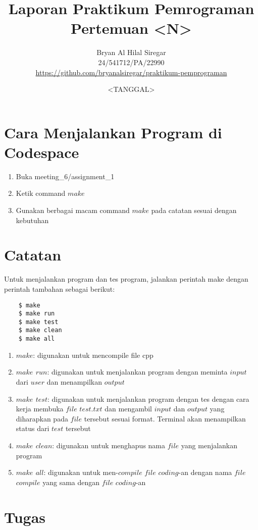 \documentclass{article}
\title{Laporan Praktikum Pemrograman\\Pertemuan <N>}
\author{Bryan Al Hilal Siregar\\ 24/541712/PA/22990\\ \href{https://github.com/bryanalsiregar/praktikum-pemprograman}{https://github.com/bryanalsiregar/praktikum-pemprograman}}
\date{<TANGGAL>}
\begin{document}
\maketitle

\section{Cara Menjalankan Program di Codespace}
\begin{enumerate}
    \item Buka meeting\_6/assignment\_1
    \item Ketik command $make$
    \item Gunakan berbagai macam command $make$ pada catatan sesuai dengan kebutuhan
\end{enumerate}

\section{Catatan}

Untuk menjalankan program dan tes program, jalankan perintah make dengan perintah tambahan sebagai berikut:
\begin{verbatim}
    $ make
    $ make run
    $ make test
    $ make clean 
    $ make all
\end{verbatim}

\begin{enumerate}
    \item \textbf{$make$}: digunakan untuk mencompile file cpp
    \item \textbf{$make$ $run$}: digunakan untuk menjalankan program dengan meminta $input$ dari $user$ dan menampilkan $output$
    \item \textbf{$make$ $test$}: digunakan untuk menjalankan program dengan tes dengan cara kerja membuka $file$ $test.txt$ dan mengambil $input$ dan $output$ yang diharapkan pada $file$ tersebut sesuai format. Terminal akan menampilkan status dari $test$ tersebut
    \item \textbf{$make$ $clean$}: digunakan untuk menghapus nama $file$ yang menjalankan program
    \item \textbf{$make$ $all$}: digunakan untuk men-$compile$ $file$ $coding$-an dengan nama $file$ $compile$ yang sama dengan $file$ $coding$-an
\end{enumerate}

\section{Tugas}
\end{document}
